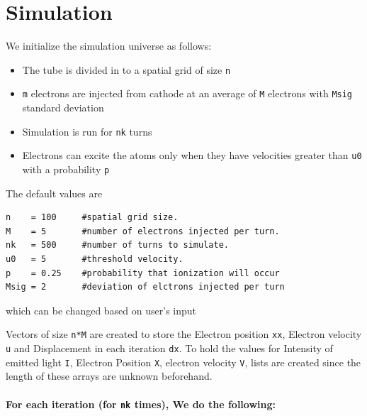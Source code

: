\documentclass[12pt, a4paper]{report}
\begin{document}
\section*{Simulation}
We initialize the simulation universe as follows:
\begin{itemize}
  	\item The tube is divided in to a spatial grid of size \texttt{n} 
  	\item \texttt{m} electrons are injected from cathode at an average of \texttt{M} electrons with \texttt{Msig} standard deviation
  	\item Simulation is run for \texttt{nk} turns 
  	\item Electrons can excite the atoms only when they have velocities greater than \texttt{u0} with a probability \texttt{p} 
\end{itemize}
The default values are 
\begin{verbatim}
n    = 100     #spatial grid size.
M    = 5       #number of electrons injected per turn.
nk   = 500     #number of turns to simulate.
u0   = 5       #threshold velocity.
p    = 0.25    #probability that ionization will occur
Msig = 2       #deviation of elctrons injected per turn
\end{verbatim}
which can be changed based on user's input

Vectors of size \texttt{n*M} are created to store the Electron position \texttt{xx}, Electron velocity \texttt{u} and Displacement in each iteration \texttt{dx}. To hold the values for Intensity of emitted light \texttt{I}, Electron Position \texttt{X}, electron velocity \texttt{V}, lists are created since the length of these arrays are unknown beforehand. \\\\

\textbf{For each iteration (for \texttt{nk} times), We do the following:} \\
\end{document}
